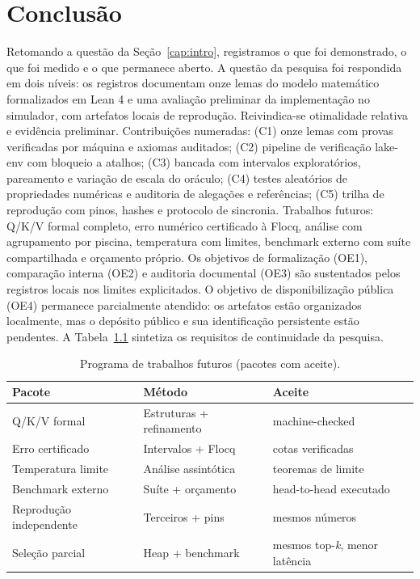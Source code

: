\chapter{Conclusão}\label{cap:conclusao}
Retomando a questão da Seção~\ref{cap:intro}, registramos o que foi demonstrado, o que foi medido e o que permanece aberto.
A questão da pesquisa foi respondida em dois níveis: os registros documentam onze lemas do modelo matemático formalizados em Lean 4 e uma avaliação preliminar da implementação no simulador, com artefatos locais de reprodução. Reivindica-se otimalidade relativa e evidência preliminar. Contribuições numeradas: (C1) onze lemas com provas verificadas por máquina e axiomas auditados; (C2) pipeline de verificação lake-env com bloqueio a atalhos; (C3) bancada com intervalos exploratórios, pareamento e variação de escala do oráculo; (C4) testes aleatórios de propriedades numéricas e auditoria de alegações e referências; (C5) trilha de reprodução com pinos, hashes e protocolo de sincronia. Trabalhos futuros: Q/K/V formal completo, erro numérico certificado à Flocq, análise com agrupamento por piscina, temperatura com limites, benchmark externo com suíte compartilhada e orçamento próprio.
Os objetivos de formalização (OE1), comparação interna (OE2) e auditoria documental (OE3) são sustentados pelos registros locais nos limites explicitados. O objetivo de disponibilização pública (OE4) permanece parcialmente atendido: os artefatos estão organizados localmente, mas o depósito público e sua identificação persistente estão pendentes.
A Tabela~\ref{tab:futuro} sintetiza os requisitos de continuidade da pesquisa.
\begin{table}[htbp]
\fontsize{10}{12}\selectfont\SingleSpacing
\centering
\caption{Programa de trabalhos futuros (pacotes com aceite).}
\label{tab:futuro}
\begin{tabularx}{\textwidth}{lXX}
\toprule
Pacote & Método & Aceite \\
\midrule
Q/K/V formal & Estruturas + refinamento & machine-checked \\
Erro certificado & Intervalos + Flocq & cotas verificadas \\
Temperatura limite & Análise assintótica & teoremas de limite \\
Benchmark externo & Suíte + orçamento & head-to-head executado \\
Reprodução independente & Terceiros + pins & mesmos números \\
Seleção parcial & Heap + benchmark & mesmos top-\textit{k}, menor latência \\
\bottomrule
\end{tabularx}
\end{table}
